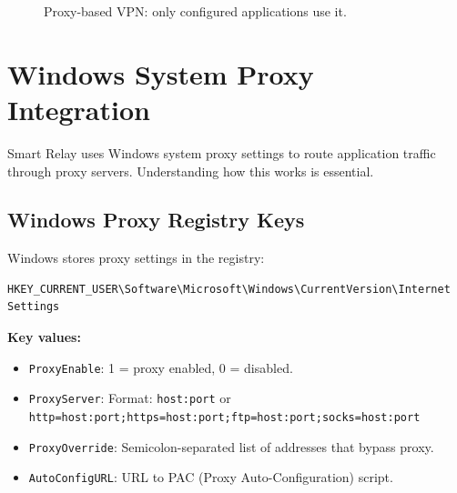 \begin{figure}[h]
    \centering
    \caption{Proxy-based VPN: only configured applications use it.}
\end{figure}

\section{Windows System Proxy Integration}

Smart Relay uses Windows system proxy settings to route application traffic through proxy servers. Understanding how this works is essential.

\subsection{Windows Proxy Registry Keys}

Windows stores proxy settings in the registry:

\begin{verbatim}
HKEY_CURRENT_USER\Software\Microsoft\Windows\CurrentVersion\Internet Settings
\end{verbatim}

\textbf{Key values:}
\begin{itemize}
    \item \texttt{ProxyEnable}: 1 = proxy enabled, 0 = disabled.
    \item \texttt{ProxyServer}: Format: \texttt{host:port} or \texttt{http=host:port;https=host:port;ftp=host:port;socks=host:port}
    \item \texttt{ProxyOverride}: Semicolon-separated list of addresses that bypass proxy.
    \item \texttt{AutoConfigURL}: URL to PAC (Proxy Auto-Configuration) script.
\end{itemize}

